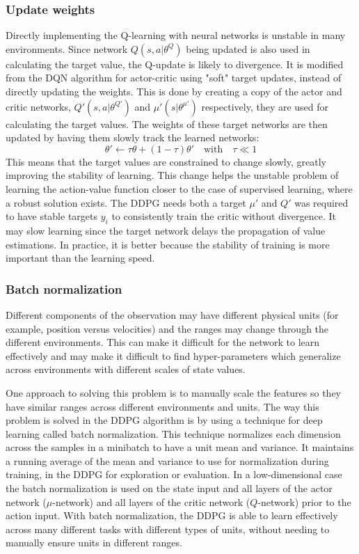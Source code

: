 \subsubsection{Update weights}
Directly implementing the Q-learning with neural networks is unstable in many environments. Since network $Q(s,a|\theta^Q)$ being updated is also used in calculating the target value, the Q-update is likely to divergence. It is modified from the DQN algorithm for actor-critic using "soft" target updates, instead of directly updating the weights. This is done by creating a copy of the actor and critic networks, $Q'(s,a|\theta^{Q'})$ and $\mu'(s|\theta^{\mu'})$ respectively, they are used for calculating the target values. The weights of these target networks are then updated by having them slowly track the learned networks: 
\begin{equation}
\theta' \leftarrow \tau \theta + (1-\tau)\theta'   \quad \textrm{with} \quad \tau \ll 1 
\end{equation}   
This means that the target values are constrained to change slowly, greatly improving the stability of learning. This change helps the unstable problem of learning the action-value function closer to the case of supervised learning, where a robust solution exists. The DDPG needs both a target $\mu'$ and $Q'$ was required to have stable targets $y_i$ to consistently train the critic without divergence. It may slow learning since the target network delays the propagation of value estimations. In practice, it is better because the stability of training is more important than the learning speed.

\subsubsection{Batch normalization}
Different components of the observation may have different physical units (for example, position versus velocities) and the ranges may change through the different environments. This can make it difficult for the network to learn effectively and may make it difficult to find hyper-parameters which generalize across environments with different scales of state values.

One approach to solving this problem is to manually scale the features so they have similar ranges across different environments and units. The way this problem is solved in the DDPG algorithm is by using a technique for deep learning called batch normalization. This technique normalizes each dimension across the samples in a minibatch to have a unit mean and variance. It maintains a running average of the mean and variance to use for normalization during training, in the DDPG for exploration or evaluation. In a low-dimensional case the batch normalization is used on the state input and all layers of the actor network ($\mu$-network) and all layers of the critic network ($Q$-network) prior to the action input. With batch normalization, the DDPG is able to learn effectively across many different tasks with different types of units, without needing to manually ensure units in different ranges.

